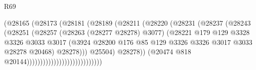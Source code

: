\begin{lexlean}{R69}
\begin{coremodule}
                                              (@28165
                                                (@28173
                                                  (@28181
                                                    (@28189
                                                      (@28211
                                                        (@28220
                                                          (@28231
                                                            (@28237
                                                              (@28243
                                                                (@28251
                                                                  (@28257
                                                                    (@28263 (@28277 @28278) @3077)
                                                                    (@28221
                                                                      @179
                                                                      @129
                                                                      @3328
                                                                      @3326
                                                                      @3033
                                                                      @3017
                                                                      (@3924
                                                                        @28200
                                                                        @176
                                                                        @85
                                                                        @129
                                                                        @3326
                                                                        @3326
                                                                        @3017
                                                                        @3033
                                                                        @28278
                                                                        @20468)
                                                                      @28278)))
                                                                @25504)
                                                              @28278))
                                                          (@20474
                                                            @818
                                                            @20144))))))))))))))))))))))))))))

\end{coremodule}
\end{lexlean}
